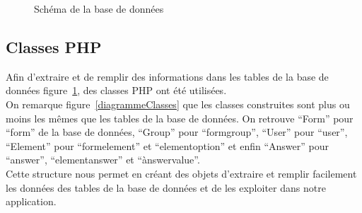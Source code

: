 \documentclass{sigplanconf}
\begin{document}
\begin{figure}
\begin{center}
\end{center}
\caption{Schéma de la base de données}\label{schemaBDD}
\end{figure}

\subsection{Classes PHP}
Afin d'extraire et de remplir des informations dans les tables de la base de données figure~\ref{schemaBDD}, des classes PHP ont été utilisées.\\
On remarque figure~\ref{diagrammeClasses} que les classes construites sont plus ou moins les mêmes que les tables de la base de données. On retrouve ``Form'' pour ``form'' de la base de données, ``Group'' pour ``formgroup'', ``User'' pour ``user'', ``Element'' pour ``formelement'' et ``elementoption'' et enfin ``Answer'' pour ``answer'', ``elementanswer'' et ``ànswervalue''.\\
Cette structure nous permet en créant des objets d'extraire et remplir facilement les données des tables de la base de données et de les exploiter dans notre application.
\end{document}
